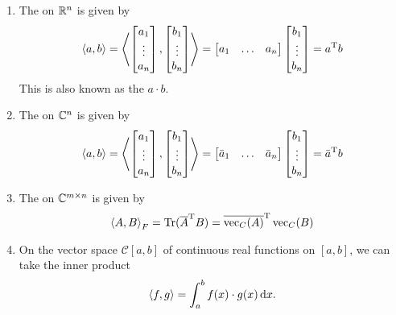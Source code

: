 \begin{example}
\begin{enumerate}
\item The  on $\mathbb{R}^n$ is given by
\[ \left\langle a,b \right\rangle = \left\langle \begin{bmatrix}
a_1 \\ \vdots \\ a_n
\end{bmatrix},\begin{bmatrix}
b_1 \\ \vdots \\ b_n
\end{bmatrix} \right\rangle = \begin{bmatrix}
a_1 & \hdots & a_n
\end{bmatrix}\begin{bmatrix}
b_1 \\ \vdots \\ b_n
\end{bmatrix} = a^{\mathrm{T}} b \]
This is also known as the  $a\cdot b$.
\item The  on $\mathbb{C}^n$ is given by
\[ \left\langle a,b \right\rangle = \left\langle \begin{bmatrix}
a_1 \\ \vdots \\ a_n
\end{bmatrix},\begin{bmatrix}
b_1 \\ \vdots \\ b_n
\end{bmatrix} \right\rangle = \begin{bmatrix}
\bar{a}_1 & \hdots & \bar{a}_n
\end{bmatrix}\begin{bmatrix}
b_1 \\ \vdots \\ b_n
\end{bmatrix} = \bar{a}^{\mathrm{T}} b \]
\item The  on $\mathbb{C}^{m\times n}$ is given by
\[ \left\langle A,B \right\rangle_F =  \operatorname{Tr}(\overline{A}^{\mathrm{T}} B) = \overline{\operatorname{vec}_C(A)}^{\mathrm{T}} \operatorname{vec}_C(B)\]
\item On the vector space $\mathcal{C}[a,b]$ of continuous real functions on $[a,b]$, we can take the inner product
\[ \left\langle f,g \right\rangle = \int_a^b f(x)\cdot g(x) \operatorname{d \!}{x}. \]
\end{enumerate}
\end{example}

